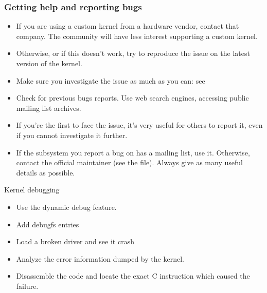 \begin{frame}
  \frametitle{Getting help and reporting bugs}
  \begin{itemize}
  \item If you are using a custom kernel from a hardware vendor, contact
        that company. The community will have less interest supporting
        a custom kernel.
  \item Otherwise, or if this doesn't work, try to reproduce the
        issue on the latest version of the kernel.
  \item Make sure you investigate the issue as much as you can: see
  \item Check for previous bugs reports. Use web search engines,
    accessing public mailing list archives.
  \item If you're the first to face the issue, it's very useful for
    others to report it, even if you cannot investigate it further.
  \item If the subsystem you report a bug on has a mailing list, use
    it. Otherwise, contact the official maintainer (see the
     file). Always give as many useful details as
    possible.
  \end{itemize}
\end{frame}

\setuplabframe
{Kernel debugging}
{
  \begin{itemize}
  \item Use the dynamic debug feature.
  \item Add debugfs entries
  \item Load a broken driver and see it crash
  \item Analyze the error information dumped by the kernel.
  \item Disassemble the code and locate the exact C instruction which
    caused the failure.
  \end{itemize}
}
